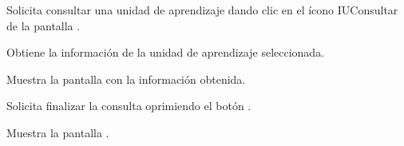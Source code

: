 \begin{UCtrayectoria}
	\UCpaso [\UCactor] Solicita consultar una unidad de aprendizaje dando clic en el ícono IUConsultar de la pantalla . 
	
	\UCpaso [\UCsist] Obtiene la información de la unidad de aprendizaje seleccionada.
	
	\UCpaso [\UCsist] Muestra la pantalla  con la información obtenida.
	
	\UCpaso [\UCactor] Solicita finalizar la consulta oprimiendo el botón . 
	
	\UCpaso [\UCsist] Muestra la pantalla .
	
\end{UCtrayectoria}

